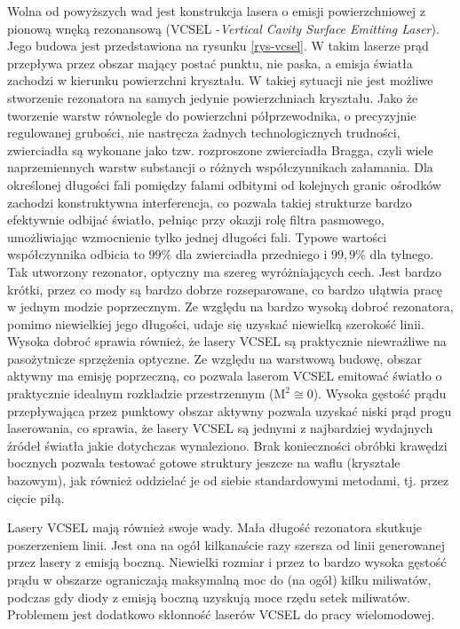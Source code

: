 \documentclass[a4paper,10pt]{article}
\begin{document}
Wolna od powyższych wad jest konstrukcja lasera o emisji powierzchniowej z pionową wnęką rezonansową (VCSEL -\textit{Vertical Cavity Surface Emitting Laser}). Jego budowa jest przedstawiona na rysunku \ref{rys-vcsel}. W takim laserze prąd przepływa przez obszar mający postać punktu, nie paska, a emisja światła zachodzi w kierunku powierzchni kryształu. W takiej sytuacji nie jest możliwe stworzenie rezonatora na samych jedynie powierzchniach kryształu. Jako że tworzenie warstw równolegle do powierzchni półprzewodnika, o precyzyjnie regulowanej grubości, nie nastręcza żadnych technologicznych trudności, zwierciadła są wykonane jako tzw. rozproszone zwierciadła Bragga, czyli wiele naprzemiennych warstw substancji o różnych współczynnikach załamania. Dla określonej długości fali pomiędzy falami odbitymi od kolejnych granic ośrodków zachodzi konstruktywna interferencja, co pozwala takiej strukturze bardzo efektywnie odbijać światło, pełniąc przy okazji rolę filtra pasmowego, umożliwiając wzmocnienie tylko jednej długości fali. Typowe wartości współczynnika odbicia to $99\%$ dla zwierciadła przedniego i $99{,}9\%$ dla tylnego. Tak utworzony rezonator, optyczny ma szereg wyróżniających cech. Jest bardzo krótki, przez co mody są bardzo dobrze rozseparowane, co bardzo ułątwia pracę w jednym modzie poprzecznym. Ze względu na bardzo wysoką dobroć rezonatora, pomimo niewielkiej jego długości, udaje się uzyskać niewielką szerokość linii. Wysoka dobroć sprawia również, że lasery VCSEL są praktycznie niewrażliwe na pasożytnicze sprzężenia optyczne.
Ze względu na warstwową budowę, obszar aktywny ma emisję poprzeczną, co pozwala laserom VCSEL emitować światło o praktycznie idealnym rozkładzie przestrzennym ($\mathrm{M^2} \cong 0$). Wysoka gęstość prądu przepływająca przez punktowy obszar aktywny pozwala uzyskać niski prąd progu laserowania, co sprawia, że lasery VCSEL są jednymi z najbardziej wydajnych źródeł światła jakie dotychczas wynaleziono. Brak konieczności obróbki krawędzi bocznych pozwala testować gotowe struktury jeszcze na waflu (krysztale bazowym), jak również oddzielać je od siebie standardowymi metodami, tj. przez cięcie piłą. 

Lasery VCSEL mają również swoje wady. Mała długość rezonatora skutkuje poszerzeniem linii. Jest ona na ogół kilkanaście razy szersza od linii generowanej przez lasery z emisją boczną. Niewielki rozmiar i przez to bardzo wysoka gęstość prądu w obszarze ograniczają maksymalną moc do (na ogół) kilku miliwatów, podczas gdy diody z emisją boczną uzyskują moce rzędu setek miliwatów. Problemem jest dodatkowo skłonność laserów VCSEL do pracy wielomodowej.
\end{document}
